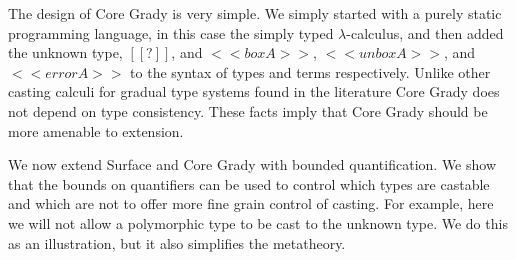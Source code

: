 The design of Core Grady is very simple.  We simply started with a
purely static programming language, in this case the simply typed
$\lambda$-calculus, and then added the unknown type, $[[?]]$, and
$<<box A>>$, $<<unbox A>>$, and $<<error A>>$ to the syntax of types
and terms respectively.  Unlike other casting calculi for gradual type
systems found in the literature \cite{Siek:2006,Siek:2015,Garcia:2016}
Core Grady does not depend on type consistency.  These facts imply
that Core Grady should be more amenable to extension.

We now extend Surface and Core Grady with bounded quantification.  We
show that the bounds on quantifiers can be used to control which types
are castable and which are not to offer more fine grain control of
casting.  For example, here we will not allow a polymorphic type to be
cast to the unknown type.  We do this as an illustration, but it also
simplifies the metatheory.


